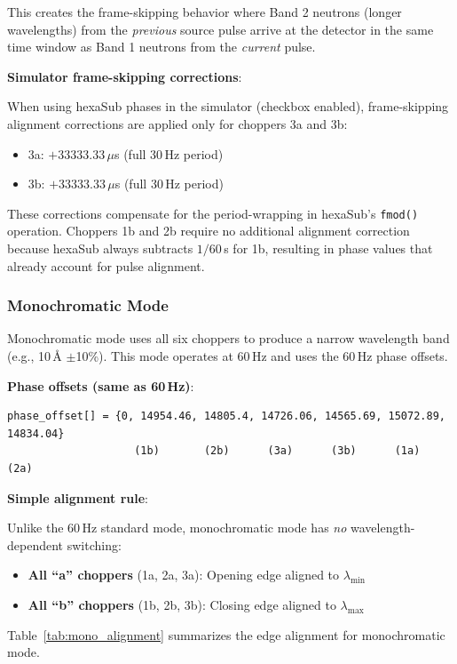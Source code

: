 \documentclass[tm]{ornltm}
\begin{document}
This creates the frame-skipping behavior where Band 2 neutrons (longer wavelengths) from the \emph{previous} source pulse arrive at the detector in the same time window as Band 1 neutrons from the \emph{current} pulse.

\textbf{Simulator frame-skipping corrections}:

When using hexaSub phases in the simulator (checkbox enabled), frame-skipping alignment corrections are applied only for choppers 3a and 3b:
\begin{itemize}
    \item 3a: $+33333.33$\,$\mu$s (full 30\,Hz period)
    \item 3b: $+33333.33$\,$\mu$s (full 30\,Hz period)
\end{itemize}

These corrections compensate for the period-wrapping in hexaSub's \texttt{fmod()} operation. Choppers 1b and 2b require no additional alignment correction because hexaSub always subtracts $1/60$\,s for 1b, resulting in phase values that already account for pulse alignment.

\subsubsection{Monochromatic Mode}

Monochromatic mode uses all six choppers to produce a narrow wavelength band (e.g., 10\,\AA{} $\pm$10\%). This mode operates at 60\,Hz and uses the 60\,Hz phase offsets.

\textbf{Phase offsets (same as 60\,Hz)}:
\begin{verbatim}
phase_offset[] = {0, 14954.46, 14805.4, 14726.06, 14565.69, 15072.89, 14834.04}
                    (1b)       (2b)      (3a)      (3b)      (1a)      (2a)
\end{verbatim}

\textbf{Simple alignment rule}:

Unlike the 60\,Hz standard mode, monochromatic mode has \emph{no} wavelength-dependent switching:
\begin{itemize}
    \item \textbf{All ``a'' choppers} (1a, 2a, 3a): Opening edge aligned to $\lambda_{\min}$
    \item \textbf{All ``b'' choppers} (1b, 2b, 3b): Closing edge aligned to $\lambda_{\max}$
\end{itemize}

Table~\ref{tab:mono_alignment} summarizes the edge alignment for monochromatic mode.
\end{document}
